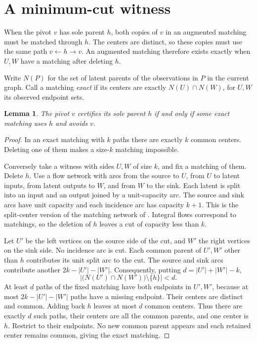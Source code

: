 \documentclass[11pt,a4paper]{amsart}
\newtheorem{lemma}[theorem]{Lemma}
\begin{document}
\section{A minimum-cut witness}

When the pivot \(v\) has sole parent \(h\), both copies of \(v\) in an augmented matching must be matched through \(h\). The centers are distinct, so these copies must use the same path \(v\leftarrow h\rightarrow v\). An augmented matching therefore exists exactly when \(U,W\) have a matching after deleting \(h\).

Write \(N(P)\) for the set of latent parents of the observations in \(P\) in the current graph. Call a matching \emph{exact} if its centers are exactly \(N(U)\cap N(W)\), for \(U,W\) its observed endpoint sets.

\begin{lemma}\label{lem:cut}
The pivot \(v\) certifies its sole parent \(h\) if and only if some exact matching uses \(h\) and avoids \(v\).
\end{lemma}

\begin{proof}
In an exact matching with \(k\) paths there are exactly \(k\) common centers. Deleting one of them makes a size-\(k\) matching impossible.

Conversely take a witness with sides \(U,W\) of size \(k\), and fix a matching of them. Delete \(h\). Use a flow network with arcs from the source to \(U\), from \(U\) to latent inputs, from latent outputs to \(W\), and from \(W\) to the sink. Each latent is split into an input and an output joined by a unit-capacity arc. The source and sink arcs have unit capacity and each incidence arc has capacity \(k+1\). This is the split-center version of the matching network of \cite[Lemma~B.2]{preprint}. Integral flows correspond to matchings, so the deletion of \(h\) leaves a cut of capacity less than \(k\).

Let \(U'\) be the left vertices on the source side of the cut, and \(W'\) the right vertices on the sink side. No incidence arc is cut. Each common parent of \(U',W'\) other than \(h\) contributes its unit split arc to the cut. The source and sink arcs contribute another \(2k-|U'|-|W'|\). Consequently, putting \(d=|U'|+|W'|-k\),
\[
 \bigl|\bigl(N(U')\cap N(W')\bigr)\setminus\{h\}\bigr|<d.
\]
At least \(d\) paths of the fixed matching have both endpoints in \(U',W'\), because at most \(2k-|U'|-|W'|\) paths have a missing endpoint. Their centers are distinct and common. Adding back \(h\) leaves at most \(d\) common centers. Thus there are exactly \(d\) such paths, their centers are all the common parents, and one center is \(h\). Restrict to their endpoints. No new common parent appears and each retained center remains common, giving the exact matching.
\end{proof}
\end{document}
